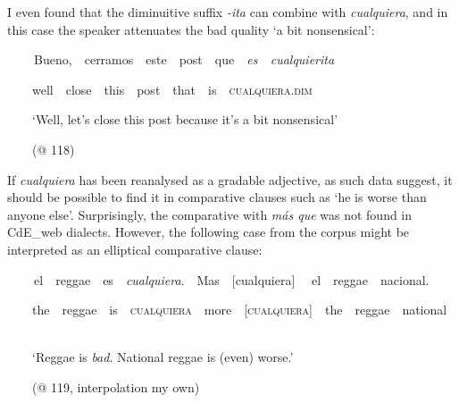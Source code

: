 \begin{styleStandard}
I even found that the diminuitive\textit{ }suffix\textit{ -ita} can combine with \textit{cualquiera}, and in this case the speaker attenuates the bad quality ‘a bit nonsensical’:
\end{styleStandard}

\begin{styleStandard}
\textbf{\ \ }\ \ Bueno,\ \ cerramos\ \ este\ \ post\ \ que\ \ \textit{es\ \ cualquierita}
\end{styleStandard}

\begin{styleStandard}
\ \ \ \ well\ \ close\ \ this\ \ post\ \ that\ \ is\ \ \textsc{cualquiera}.\textsc{dim}
\end{styleStandard}

\begin{styleStandard}
\ \ \ \ ‘Well, let’s close this post because it’s a bit nonsensical’
\end{styleStandard}

\begin{styleStandard}
\ \ \ \ (@ 118) 
\end{styleStandard}

\begin{styleStandard}
If \textit{cualquiera} has been reanalysed as a gradable adjective, as such data suggest, it should be possible to find it in comparative clauses such as ‘he is worse than anyone else’. Surprisingly, the comparative with \textit{más que} was not found in CdE\_web dialects. However, the following case from the corpus might be interpreted as an elliptical comparative clause:
\end{styleStandard}

\begin{styleStandard}
\textbf{\ \ }\ \ el\ \ reggae\ \ es\ \ \textit{cualquiera}.\ \ Mas\ \ [cualquiera] \ \ el\ \ reggae\ \ nacional.\ \ 
\end{styleStandard}

\begin{styleStandard}
\ \ \ \ the\ \ reggae\ \ is\ \ \textsc{cualquiera}\ \ more\ \ \textsc{[cualquiera]}\ \ the\ \ reggae\ \ national\ \ 
\end{styleStandard}

\begin{styleStandard}
\ \ \ \ ‘Reggae is \textit{bad}. National reggae is (even) worse.’
\end{styleStandard}

\begin{styleStandard}
\ \ \ \ (@ 119, interpolation my own)
\end{styleStandard}

